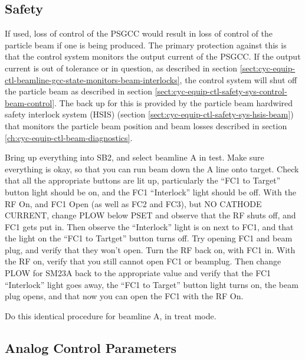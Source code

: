 \documentclass[11pt]{book}		%
\begin{document}
\subsection{Safety}

If used, loss of control of the PSGCC would result in loss of control of the particle beam if one is being produced.  The primary protection against this is that the control system monitors the output current of the PSGCC.  If the output current is out of tolerance or in question, as described in section \ref{sect:cyc-equip-ctl-beamline-gcc-state-monitors-beam-interlocks}, the control system will shut off the particle beam as described in section \ref{sect:cyc-equip-ctl-safety-sys-control-beam-control}.  The back up for this is provided by the particle beam hardwired safety interlock system (HSIS) (section \ref{sect:cyc-equip-ctl-safety-sys-hsis-beam}) that monitors the particle beam position and beam losses described in section \ref{ch:cyc-equip-ctl-beam-diagnostics}.


\color{red}

Bring up everything into SB2, and select beamline A in test. Make sure everything is okay, so that you can run beam down the A line onto target. Check that all the appropriate buttons are lit up, particularly the ``FC1 to Target'' button light should be on, and the FC1 ``Interlock'' light should be off. With the RF On, and FC1 Open (as well as FC2 and FC3), but NO CATHODE CURRENT, change PLOW below PSET and observe that the RF shuts off, and FC1 gets put in. Then observe the ``Interlock'' light is on next to FC1, and that the light on the ``FC1 to Tartget'' button turns off. Try opening FC1 and beam plug, and verify that they won't open. Turn the RF back on, with FC1 in. With the RF on, verify that you still cannot open FC1 or beamplug. Then change PLOW for SM23A back to the appropriate value and verify that the FC1 ``Interlock'' light goes away, the ``FC1 to Target'' button light turns on, the beam plug opens, and that now you can open the FC1 with the RF On.

Do this identical procedure for beamline A, in treat mode.

\color{black}


\subsection{Analog Control Parameters}
\end{document}
